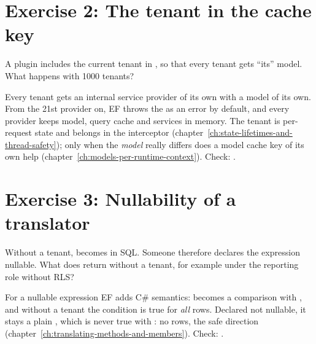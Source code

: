 \section{Exercise 2: The tenant in the cache key}

A plugin includes the current tenant in
, so that
every tenant gets “its” model. What happens with 1000 tenants?

\begin{note}[Solution]
  Every tenant gets an internal service provider of its own with a model of its own. From the
  21st provider on, EF throws the
   as
  an error by default, and every provider keeps model, query cache and services in memory. The
  tenant is per-request state and belongs in the interceptor
  (chapter~\ref{ch:state-lifetimes-and-thread-safety}); only when the \emph{model} really
  differs does a model cache key of its own help (chapter~\ref{ch:models-per-runtime-context}).
  Check: .
\end{note}

\section{Exercise 3: Nullability of a translator}

Without a tenant,  becomes  in SQL.
Someone therefore declares the expression nullable. What does
return without a tenant, for example under the reporting role without RLS?

\begin{note}[Solution]
  For a nullable expression EF adds C\# semantics: \code{<>} becomes a comparison with
  , and without a tenant the condition is
  true for \emph{all} rows. Declared not nullable, it stays a plain \code{<>}, which is never true
  with : no rows, the safe direction
  (chapter~\ref{ch:translating-methods-and-members}).
  Check: .
\end{note}

